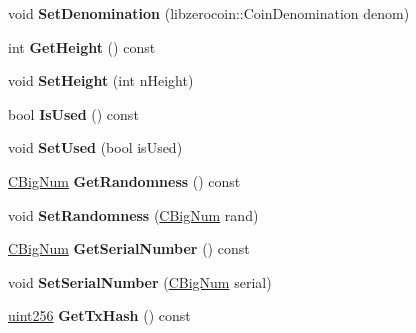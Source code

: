 \begin{DoxyCompactItemize}
\mbox{\label{class_c_zerocoin_mint_a104918900eb68de7a76b33bed2903a14}} 
void {\bfseries Set\+Denomination} (libzerocoin\+::\+Coin\+Denomination denom)
\item 
\mbox{\label{class_c_zerocoin_mint_a82c97a7a95681d80864e7a4b95ad72e9}} 
int {\bfseries Get\+Height} () const
\item 
\mbox{\label{class_c_zerocoin_mint_ac6bb1c9eb49530f9897da8189086d069}} 
void {\bfseries Set\+Height} (int n\+Height)
\item 
\mbox{\label{class_c_zerocoin_mint_a10d1fc99d49db5fff44bf2db23a590a7}} 
bool {\bfseries Is\+Used} () const
\item 
\mbox{\label{class_c_zerocoin_mint_a53301ad0b31d2b78e32625a9e2d1dc26}} 
void {\bfseries Set\+Used} (bool is\+Used)
\item 
\mbox{\label{class_c_zerocoin_mint_ae28cfb14427ec02124be3f70679d1de7}} 
\mbox{\hyperlink{class_c_big_num}{C\+Big\+Num}} {\bfseries Get\+Randomness} () const
\item 
\mbox{\label{class_c_zerocoin_mint_ad3e0ce8df3da37ca6de64c99b12e4913}} 
void {\bfseries Set\+Randomness} (\mbox{\hyperlink{class_c_big_num}{C\+Big\+Num}} rand)
\item 
\mbox{\label{class_c_zerocoin_mint_ac051c49289a4f2bd3913cc8774d960c1}} 
\mbox{\hyperlink{class_c_big_num}{C\+Big\+Num}} {\bfseries Get\+Serial\+Number} () const
\item 
\mbox{\label{class_c_zerocoin_mint_ad82530f1209899bae220972e0555730d}} 
void {\bfseries Set\+Serial\+Number} (\mbox{\hyperlink{class_c_big_num}{C\+Big\+Num}} serial)
\item 
\mbox{\label{class_c_zerocoin_mint_a3e918a75e2b98edcdb9f81416abbbd83}} 
\mbox{\hyperlink{classuint256}{uint256}} {\bfseries Get\+Tx\+Hash} () const
\item 
\mbox{\label{class_c_zerocoin_mint_a3ede2b4a3e7c28311f332037af495e29}} 

\end{DoxyCompactItemize}

